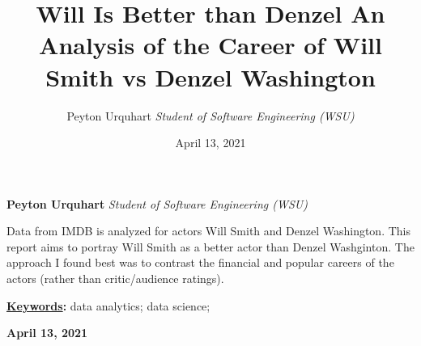 \documentclass[]{article}
\title{\textbf{\textcolor{WSU.crimson}{Will Is Better than
Denzel}} \newline \textbf{\textcolor{WSU.gray}{An Analysis of the Career
of Will Smith vs Denzel Washington}}  }
\author{\Large Peyton
Urquhart\vspace{0.05in} \newline\normalsize\emph{Student of Software
Engineering (WSU)}  }
\date{April 13, 2021}
\newcommand*{\authorfont}{\fontfamily{phv}\selectfont}
\renewenvironment{abstract}
 {{%
    \setlength{\leftmargin}{0mm}
    \setlength{\rightmargin}{\leftmargin}%
  }%
  \relax}
 {\endlist}
\begin{document}
	
%    


{%
\setlength{\parindent}{0pt}
\thispagestyle{plain}
{\fontsize{18}{20}\selectfont\raggedright 
\maketitle  %

}

{
   \vskip 13.5pt\relax \normalsize\fontsize{11}{12} 
   
\textbf{\authorfont Peyton Urquhart} \hskip 15pt \emph{\small Student of
Software Engineering (WSU)}   

}

}








\begin{abstract}

    \hbox{\vrule height .2pt width 39.14pc}

    \vskip 8.5pt %

\noindent Data from IMDB is analyzed for actors Will Smith and Denzel
Washington. This report aims to portray Will Smith as a better actor
than Denzel Washginton. The approach I found best was to contrast the
financial and popular careers of the actors (rather than critic/audience
ratings).


\vskip 8.5pt \noindent \textbf{\underline{Keywords}:} data analytics;
data science; \par

    




    
    \hbox{\vrule height .2pt width 39.14pc}
    \vskip 5pt 
    \hfill \textbf{\textcolor{WSU.gray}{ April 13, 2021 } }
    \vskip 5pt 
    
\end{abstract}


\vskip -8.5pt




\noindent  
\end{document}
